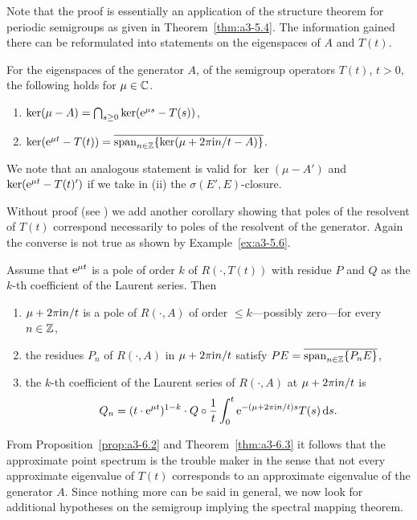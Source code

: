 Note that the proof is essentially an application of the structure theorem for periodic semigroups as given in Theorem~\ref{thm:a3-5.4}.
The information gained there can be reformulated into statements on the eigenspaces of\/ $A$ and $T(t)$.
\begin{corollary}\label{cor:a3-6.4}
For the eigenspaces of the generator $A$, \resp of the semigroup operators $T(t)$, $t > 0$, the following holds  for  $\mu \in \mathbb{C}$. 
\begin{enumerate}[\upshape (i)]
\item 
$\ker(\mu - A) = \bigcap_{s \geq 0} \ker(\eu^{\mu s} - T(s))$,

\item 
$\ker(\mathrm{e}^{\mu t} - T(t)) = \overline{\mathrm{span}_{n \in \mathbb{Z}} \{\ker(\mu + 2\pi\mathrm{i}  n/t - A)\}}$. 

\end{enumerate}
\end{corollary}
We note that an analogous statement is valid for $\ker(\mu - A')$ and $\ker(\mathrm{e}^{\mu t} - T(t)')$ if we take in (ii) the $\sigma(E',E)$-closure.

Without proof (see \textcite[Proposition~1.10]{greiner:1981}) we add another corollary showing that poles of the resolvent of\/ $T(t)$ correspond necessarily to poles of the resolvent of the generator.
Again the converse is not true as shown by Example~\ref{ex:a3-5.6}.
\begin{corollary}\label{cor:a3-6.5}
Assume that $\mathrm{e}^{\mu t}$ is a pole of order $k$ of\/ $R(\cdot,T(t))$ with residue $P$ and $Q$ as the $k$-th coefficient of the Laurent series.
Then
\begin{enumerate}[\upshape (i)]
\item 
$\mu + 2\pi\mathrm{i}  n/t$ is a pole of\/ $R(\cdot,A)$ of order $\leq k$---possibly zero---for every $n \in \mathbb{Z}$,

\item 
the residues $P_{n}$ of $R(\cdot,A)$ in $\mu + 2\pi\mathrm{i}  n/t$ satisfy $PE = \overline{\mathrm{span}_{n \in \mathbb{Z}} \{P_{n}E\}}$,

\item 
the $k$-th coefficient of the Laurent series of\/ $R(\cdot,A)$ at $\mu + 2\pi\mathrm{i}  n/t$ is
\[
Q_{n} = (t \cdot \mathrm{e}^{\mu t})^{1-k} \cdot Q \circ \frac{1}{t} \int_{0}^{t} \mathrm{e}^{-(\mu+2\pi\mathrm{i}  n/t)s}T(s) \mathop{}\!\mathrm{d}{s} .
\]
\end{enumerate}
\end{corollary}
From Proposition~\ref{prop:a3-6.2} and Theorem~\ref{thm:a3-6.3} it follows that the approximate point spectrum 
is the trouble maker in the sense that not every approximate eigenvalue of\/ $T(t)$ corresponds to an approximate eigenvalue of the generator $A$.
Since nothing more can be said in general, we now look for additional hypotheses on the semigroup implying the spectral mapping theorem.

